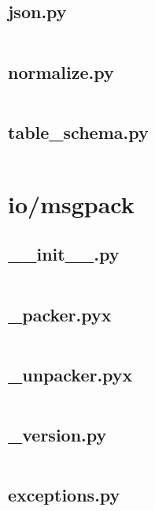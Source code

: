 \documentclass{article}
\begin{document}
\subsection{json.py}
\inputminted{python}{/home/dufferzafar/dev/@clones/pandas/pandas/io/json/json.py}
\newpage

\subsection{normalize.py}
\inputminted{python}{/home/dufferzafar/dev/@clones/pandas/pandas/io/json/normalize.py}
\newpage

\subsection{table\_schema.py}
\inputminted{python}{/home/dufferzafar/dev/@clones/pandas/pandas/io/json/table_schema.py}
\newpage

\section{io/msgpack}

\subsection{\_\_init\_\_.py}
\inputminted{python}{/home/dufferzafar/dev/@clones/pandas/pandas/io/msgpack/__init__.py}
\newpage

\subsection{\_packer.pyx}
\inputminted{cython}{/home/dufferzafar/dev/@clones/pandas/pandas/io/msgpack/_packer.pyx}
\newpage

\subsection{\_unpacker.pyx}
\inputminted{cython}{/home/dufferzafar/dev/@clones/pandas/pandas/io/msgpack/_unpacker.pyx}
\newpage

\subsection{\_version.py}
\inputminted{python}{/home/dufferzafar/dev/@clones/pandas/pandas/io/msgpack/_version.py}
\newpage

\subsection{exceptions.py}
\inputminted{python}{/home/dufferzafar/dev/@clones/pandas/pandas/io/msgpack/exceptions.py}
\newpage
\end{document}
